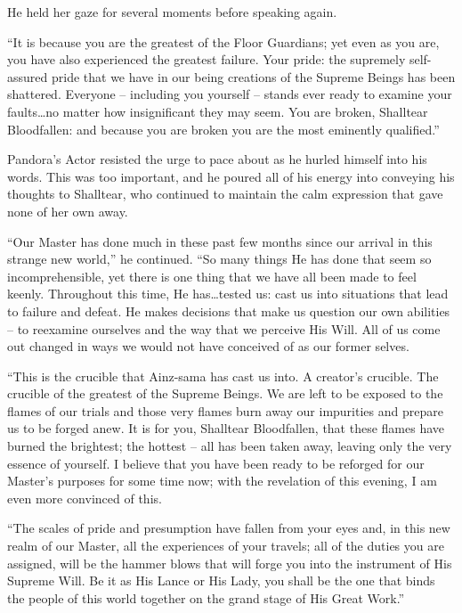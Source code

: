  

He held her gaze for several moments before speaking again.

 

“It is because you are the greatest of the Floor Guardians; yet even as you are, you have also experienced the greatest failure. Your pride: the supremely self-assured pride that we have in our being creations of the Supreme Beings has been shattered. Everyone – including you yourself – stands ever ready to examine your faults…no matter how insignificant they may seem. You are broken, Shalltear Bloodfallen: and because you are broken you are the most eminently qualified.”

 

Pandora’s Actor resisted the urge to pace about as he hurled himself into his words. This was too important, and he poured all of his energy into conveying his thoughts to Shalltear, who continued to maintain the calm expression that gave none of her own away.

 

“Our Master has done much in these past few months since our arrival in this strange new world,” he continued. “So many things He has done that seem so incomprehensible, yet there is one thing that we have all been made to feel keenly. Throughout this time, He has…tested us: cast us into situations that lead to failure and defeat. He makes decisions that make us question our own abilities – to reexamine ourselves and the way that we perceive His Will. All of us come out changed in ways we would not have conceived of as our former selves.

 

“This is the crucible that Ainz-sama has cast us into. A creator’s crucible. The crucible of the greatest of the Supreme Beings. We are left to be exposed to the flames of our trials and those very flames burn away our impurities and prepare us to be forged anew. It is for you, Shalltear Bloodfallen, that these flames have burned the brightest; the hottest – all has been taken away, leaving only the very essence of yourself. I believe that you have been ready to be reforged for our Master’s purposes for some time now; with the revelation of this evening, I am even more convinced of this.

 

“The scales of pride and presumption have fallen from your eyes and, in this new realm of our Master, all the experiences of your travels; all of the duties you are assigned, will be the hammer blows that will forge you into the instrument of His Supreme Will. Be it as His Lance or His Lady, you shall be the one that binds the people of this world together on the grand stage of His Great Work.”

